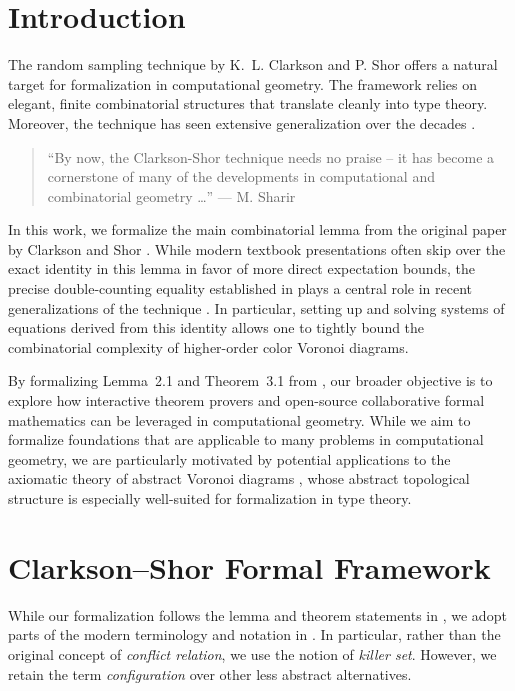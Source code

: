 \setcounter{chapter}{1}

\section{Introduction}

The random sampling technique by K.~L. Clarkson and P. Shor \cite{Clarkson89} offers a natural target for formalization in computational geometry. The framework relies on elegant, finite combinatorial structures that translate cleanly into type theory. Moreover, the technique has seen extensive generalization over the decades \cite{Sharir03, Bae25}.

\begin{quote}
``By now, the Clarkson-Shor technique needs no praise -- it has become a cornerstone of many of the developments in computational and combinatorial geometry \dots'' --- M. Sharir \cite{Sharir03}
\end{quote}

In this work, we formalize the main combinatorial lemma from the original paper by Clarkson and Shor \cite{Clarkson89}. While modern textbook presentations \cite{Mulmuley94, HarPeled11} often skip over the exact identity in this lemma in favor of more direct expectation bounds, the precise double-counting equality established in \cite[Lemma~2.1]{Clarkson89} plays a central role in recent generalizations of the technique \cite{Bae25}. In particular, setting up and solving systems of equations derived from this identity allows one to tightly bound the combinatorial complexity of higher-order color Voronoi diagrams.

By formalizing Lemma~2.1 and Theorem~3.1 from \cite{Clarkson89}, our broader objective is to explore how interactive theorem provers and open-source collaborative formal mathematics \cite{Mathlib20} can be leveraged in computational geometry. While we aim to formalize foundations that are applicable to many problems in computational geometry, we are particularly motivated by potential applications to the axiomatic theory of abstract Voronoi diagrams \cite{Klein89}, whose abstract topological structure is especially well-suited for formalization in type theory.

\section{Clarkson--Shor Formal Framework}

While our formalization follows the lemma and theorem statements in \cite{Clarkson89}, we adopt parts of the modern terminology and notation in \cite{HarPeled11}. In particular, rather than the original concept of \emph{conflict relation}, we use the notion of \emph{killer set}. However, we retain the term \emph{configuration} over other less abstract alternatives.

